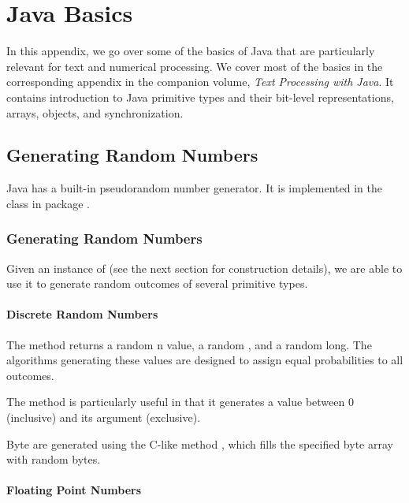 \chapter{Java Basics}\label{chapter:java}

In this appendix, we go over some of the basics of Java that are
particularly relevant for text and numerical processing.   We
cover most of the basics in the corresponding appendix in the
companion volume, {\it Text Processing with Java}.  It contains
introduction to Java primitive types and their bit-level
representations, arrays, objects, and synchronization.



\section{Generating Random Numbers}\label{section:java-random}

Java has a built-in pseudorandom number generator.  It is implemented
in the class  in package .  

\subsection{Generating Random Numbers}

Given an instance of  (see the next section for
construction details), we are able to use it to generate random
outcomes of several primitive types. 

\subsubsection{Discrete Random Numbers}

The method  returns a random n
value,  a random , and  a
random long.  The algorithms generating these values are designed to
assign equal probabilities to all outcomes.  

The method  is particularly useful in that it
generates a value between 0 (inclusive) and its argument (exclusive).

Byte are generated using the C-like method ,
which fills the specified byte array with random bytes.  

\subsubsection{Floating Point Numbers}

